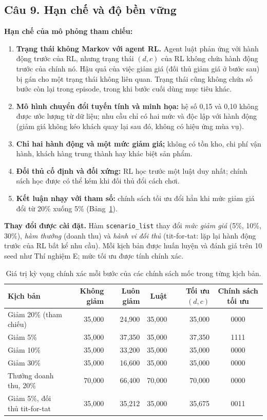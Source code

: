 \documentclass[12pt,a4paper]{report}
\newcommand{\SRC}{"../../src/Agent 02/agent02_experiment.py"}
\newcommand{\CodeLines}[2]{\VerbatimInput[fontsize=\scriptsize,frame=single,
  breaklines=true,numbers=left,numbersep=4pt,firstline=#1,lastline=#2,
  baselinestretch=1.0]{\SRC}}
\begin{document}
\subsection*{Câu 9. Hạn chế và độ bền vững}
\textbf{Hạn chế của mô phỏng tham chiếu:}
\begin{enumerate}
\item \textbf{Trạng thái không Markov với agent RL.} Agent luật phản ứng với hành
  động trước của RL, nhưng trạng thái $(d,c)$ của RL không chứa hành động trước
  của chính nó. Hậu quả của việc giảm giá (đối thủ giảm giá ở bước sau) bị gán cho
  một trạng thái không liên quan. Trạng thái cũng không chứa số bước còn lại trong
  episode, trong khi bước cuối dùng mục tiêu khác.
\item \textbf{Mô hình chuyển đổi tuyến tính và minh họa:} hệ số 0{,}15 và 0{,}10
  không được ước lượng từ dữ liệu; nhu cầu chỉ có hai mức và độc lập với hành động
  (giảm giá không kéo khách quay lại sau đó, không có hiệu ứng mùa vụ).
\item \textbf{Chỉ hai hành động và một mức giảm giá;} không có tồn kho, chi phí
  vận hành, khách hàng trung thành hay khác biệt sản phẩm.
\item \textbf{Đối thủ cố định và đối xứng:} RL học trước một luật duy nhất; chính
  sách học được có thể kém khi đối thủ đổi cách chơi.
\item \textbf{Kết luận nhạy với tham số:} chính sách tối ưu đổi hẳn khi mức giảm giá
  đổi từ 20\% xuống 5\% (Bảng~\ref{tab:exact}).
\end{enumerate}

\textbf{Thay đổi được cài đặt.} Hàm \texttt{scenario\_list} thay đổi \emph{mức giảm
giá} (5\%, 10\%, 30\%), \emph{hàm thưởng} (doanh thu) và \emph{hành vi đối thủ}
(tit-for-tat: lặp lại hành động trước của RL bất kể nhu cầu). Mỗi kịch bản được huấn
luyện và đánh giá trên 10 seed như Thí nghiệm E; mức tối ưu được tính chính xác.
\CodeLines{1567}{1584}

\begin{table}[H]
\centering
\small
\caption{Giá trị kỳ vọng chính xác mỗi bước của các chính sách mốc trong từng kịch bản.}
\label{tab:exact}
\begin{tabular}{lrrrrc}
\toprule
Kịch bản & Không giảm & Luôn giảm & Luật & Tối ưu $(d,c)$ & Chính sách tối ưu \\
\midrule
Giảm 20\% (tham chiếu) & 35{,}000 & 24{,}900 & 35{,}000 & 35{,}000 & 0000 \\
Giảm 5\% & 35{,}000 & 37{,}350 & 35{,}000 & 37{,}350 & 1111 \\
Giảm 10\% & 35{,}000 & 33{,}200 & 35{,}000 & 35{,}000 & 0000 \\
Giảm 30\% & 35{,}000 & 16{,}600 & 35{,}000 & 35{,}000 & 0000 \\
Thưởng doanh thu, 20\% & 70{,}000 & 66{,}400 & 70{,}000 & 70{,}000 & 0000 \\
Giảm 5\%, đối thủ tit-for-tat & 35{,}000 & 35{,}212 & 35{,}000 & 35{,}675 & 0011 \\
\bottomrule
\end{tabular}
\end{table}
\end{document}
